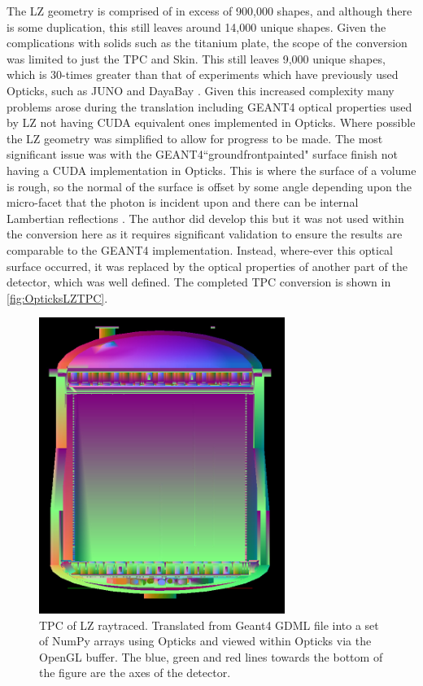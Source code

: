 \par
The LZ geometry is comprised of in excess of 900,000 shapes, and although there is some duplication, this still leaves around 14,000 unique shapes.
Given the complications with solids such as the titanium plate, the scope of the conversion was limited to just the TPC and Skin.
This still leaves 9,000 unique shapes, which is 30-times greater than that of experiments which have previously used Opticks, such as JUNO and DayaBay \cite{Opticks_CHEP_2021_ref}.
Given this increased complexity many problems arose during the translation including GEANT4 optical properties used by LZ not having CUDA equivalent ones implemented in Opticks.
Where possible the LZ geometry was simplified to allow for progress to be made.
The most significant issue was with the GEANT4``groundfrontpainted" surface finish not having a CUDA implementation in Opticks.
This is where the surface of a volume is rough, so the normal of the surface is offset by some angle depending upon the micro-facet that the photon is incident upon and there can be internal Lambertian reflections \cite{optical_photons_in_geant4_ref}.
The author did develop this but it was not used within the conversion here as it requires significant validation to ensure the results are comparable to the GEANT4 implementation.
Instead, where-ever this optical surface occurred, it was replaced by the optical properties of another part of the detector, which was well defined.
The completed TPC conversion is shown in \autoref{fig:OpticksLZTPC}.
\begin{figure}
\includegraphics[width=8cm]{Figures/Simulations/LZ_In_Opticks.png}
\centering
\caption{TPC of LZ raytraced. Translated from Geant4 GDML file into a set of NumPy arrays using Opticks and viewed within Opticks via the OpenGL buffer.
The blue, green and red lines towards the bottom of the figure are the axes of the detector.}
\label{fig:OpticksLZTPC}
\end{figure}

